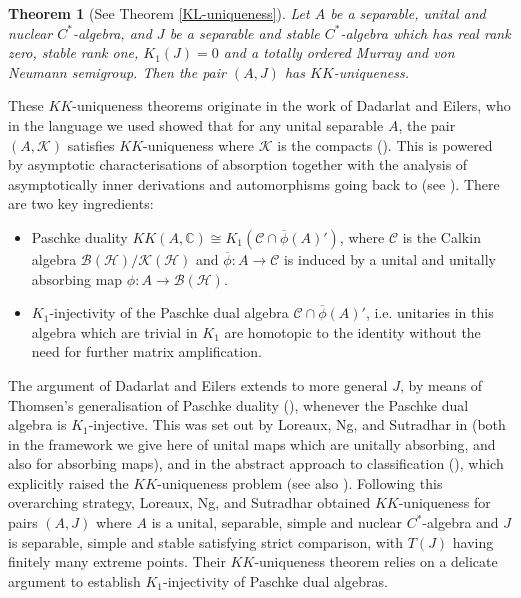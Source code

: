 \documentclass[reqno]{amsart}
\newtheorem{mainthm}{Theorem}
\theoremstyle{definition}
\theoremstyle{remark}
\numberwithin{equation}{section}
\theoremstyle{definition}
\newcommand{\calC}{\mathcal{C}}
\begin{document}
\begin{mainthm}[See Theorem \ref{KL-uniqueness}] 
\label{Intro:KKUnique}
Let $A$ be a separable, unital and nuclear $C^*$-algebra, and $J$ be a separable and stable $C^*$-algebra which has real rank zero, stable rank one, $K_1(J)=0$ and a totally ordered Murray and von Neumann semigroup. Then the pair $(A,J)$ has $KK$-uniqueness.
\end{mainthm}

These $KK$-uniqueness theorems originate in the work of Dadarlat and Eilers, who in the language we used showed that for any unital separable $A$, the pair $(A,\mathcal K)$ satisfies $KK$-uniqueness where $\mathcal K$ is the compacts (\cite[Theorem 3.12]{Dadarlet-Eilers}). This is powered by asymptotic characterisations of absorption together with the analysis of asymptotically inner derivations and automorphisms going back to \cite{KadisonRingrose} (see \cite[Section 8]{Pedersen:Book}). There are two key ingredients:
\begin{itemize}
    \item 
Paschke duality $KK(A, \mathbb{C}) \cong K_{1}(\calC \cap \overline{\phi}(A)')$, where $\mathcal C$ is the Calkin algebra $\mathcal B(\mathcal H)/\mathcal K(\mathcal H)$ and $\overline{\phi}:A\to\mathcal C$ is induced by a unital and unitally absorbing map $\phi:A\to\mathcal B(\mathcal H)$.
\item $K_1$-injectivity of the Paschke dual algebra $\calC \cap \overline{\phi}(A)'$, i.e. unitaries in this algebra which are trivial in $K_1$ are homotopic to the identity without the need for further matrix amplification.
\end{itemize}

The argument of Dadarlat and Eilers extends to more general $J$, by means of Thomsen's generalisation of Paschke duality (\cite{Thomsen}), whenever the Paschke dual algebra is $K_1$-injective.  This was set out by Loreaux, Ng, and Sutradhar in \cite[Theorem 2.6]{K1-injective} (both in the framework we give here of unital maps which are unitally absorbing, and also for absorbing maps), and in the abstract approach to classification (\cite[Section 5]{CGSTW}), which explicitly raised the $KK$-uniqueness problem (see also \cite[Section 17]{99Q}). Following this overarching strategy, Loreaux, Ng, and Sutradhar obtained $KK$-uniqueness for pairs $(A,J)$ where $A$ is a unital, separable, simple and nuclear $C^*$-algebra and $J$ is separable, simple and stable satisfying strict comparison, with $T(J)$ having finitely many extreme points. Their  $KK$-uniqueness theorem relies on a delicate argument to establish $K_{1}$-injectivity of Paschke dual algebras.
\end{document}
